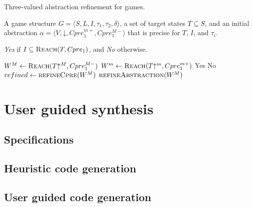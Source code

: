 \documentclass{book}
\newcommand{\reach}[0]{\textsc{Reach}}
\newcommand{\concrete}[1]{#1\mathord{\downarrow}}
\newcommand{\abstractm}[1]{#1\mathord{\uparrow^m}}
\newcommand{\abstractM}[1]{#1\mathord{\uparrow^M}}
\theoremstyle{definition}
\begin{document}
%

\begin{algorithm}
\caption{Three-valued abstraction refinement for games.}
\label{alg:generic}

\begin{algorithmic}[1]

     A game structure $G = \langle S, L, I, \tau_1, \tau_2, \delta \rangle$, a set 
    of target states $T\subseteq S$, and an initial abstraction $\alpha=\langle V, \concrete{}, Cpre_1^{m+}, Cpre_1^{M-} \rangle$
    that is precise for $T$, $I$, and $\tau_i$.

     {\it Yes} if $I \subseteq \reach(T, Cpre_1)$, and {\it No} otherwise.

    \Loop
        \State $W^M \gets \reach(\abstractM{T}, Cpre_1^{M-})$
        \State $W^m \gets \reach(\abstractm{T}, Cpre_1^{m+})$
        \If{$\abstractM{I} \subseteq W^M$} 
            \State\Return Yes
        \ElsIf{$\abstractM{I} \nsubseteq W^m$} 
            \State\Return No
        \Else       
            \State $refined \gets \Call{refineCpre}{W^M}$
                \State$\Call{refineAbstraction}{W^M}$
            \EndIf
        \EndIf
    \EndLoop
\end{algorithmic}
\end{algorithm}

\chapter{User guided synthesis}

\section{Specifications}
\section{Heuristic code generation}
\section{User guided code generation}
\end{document}
